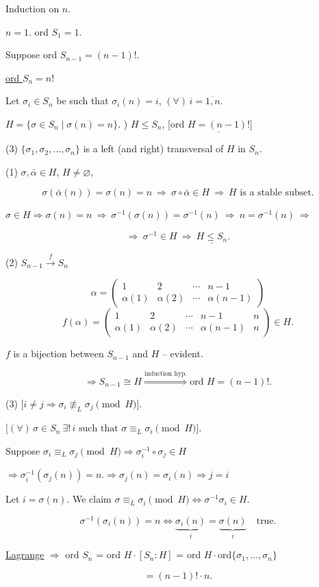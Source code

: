 \documentclass[12pt]{article}
\begin{document}
\noindent Induction on $n$.

\bigskip
\noindent $n=1$. \quad ord $S_1=1$.

\bigskip
\noindent Suppose ord $S_{n-1}=(n-1)!$.

\noindent\underline{ord $S_n=n!$}

\bigskip
\noindent Let $\sigma_i\in S_n$ be such that $\sigma_i(n)=i$, $(\forall)\, i=\overline{1,n}$.

\bigskip
\noindent $H=\{\sigma\in S_n \mid \sigma(n)=n\}$. ) \underline{$H\leq S_n$}, [ord $\underline{H=(n-1)!}$]

\bigskip
\noindent (3) $\{\sigma_1,\sigma_2,\ldots,\sigma_n\}$ is a left (and right) transversal of $H$ in $S_n$.

\bigskip
\noindent (1) $\sigma,\bar\alpha\in H$, $H\neq\varnothing$,

\[
\sigma(\bar\alpha(n))=\sigma(n)=n \ \Rightarrow \ \sigma\circ\bar\alpha\in H \ \Rightarrow \ H \text{ is a stable subset.}
\]

\noindent $\sigma\in H \Rightarrow \sigma(n)=n \ \Rightarrow \ \sigma^{-1}(\sigma(n))=\sigma^{-1}(n) \ \Rightarrow \ n=\sigma^{-1}(n) \ \Rightarrow$

\[
\Rightarrow \ \sigma^{-1}\in H \ \Rightarrow \ \underline{H\leq S_n}.
\]

\bigskip
\noindent (2) \quad $S_{n-1} \xrightarrow{\ f\ } S_n$

\[
\alpha = \begin{pmatrix} 1 & 2 & \cdots & n-1 \\ \alpha(1) & \alpha(2) & \cdots & \alpha(n-1) \end{pmatrix}
\]
\[
f(\alpha) = \begin{pmatrix} 1 & 2 & \cdots & n-1 & n \\ \alpha(1) & \alpha(2) & \cdots & \alpha(n-1) & n \end{pmatrix} \in H.
\]

\noindent $f$ is a bijection between $S_{n-1}$ and $H$ -- evident.

\[
\Rightarrow S_{n-1}\cong H \overset{\text{induction hyp.}}{\Longrightarrow} \text{ord } H=(n-1)!.
\]

\bigskip
\noindent (3) \quad $\big[i\neq j \Rightarrow \sigma_i \not\equiv_L \sigma_j \pmod H\big]$.

\noindent $\big[(\forall)\, \sigma\in S_n \ \exists!\, i \text{ such that } \sigma\equiv_L \sigma_i \pmod H\big]$.

\bigskip
\noindent Suppose $\sigma_i\equiv_L\sigma_j \pmod H \Rightarrow \sigma_i^{-1}\circ\sigma_j\in H$

\noindent $\Rightarrow \sigma_i^{-1}(\sigma_j(n))=n. \Rightarrow \sigma_j(n)=\sigma_i(n) \Rightarrow j=i$

\bigskip
\noindent Let $i=\sigma(n)$. We claim $\sigma\equiv_L\sigma_i \pmod H \Leftrightarrow \sigma^{-1}\sigma_i\in H$.

\[
\sigma^{-1}(\sigma_i(n))=n \Leftrightarrow \underbrace{\sigma_i(n)}_{i} = \underbrace{\sigma(n)}_{i} \quad \text{true.}
\]

\bigskip
\noindent\underline{Lagrange} $\Rightarrow$ ord $S_n$ = ord $H\cdot[S_n:H]$ = ord $H\cdot$ord$\{\sigma_1,\ldots,\sigma_n\}$

\[
= (n-1)!\cdot n.
\]
\end{document}
